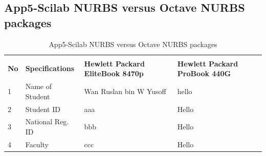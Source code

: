 \begin{landscape}
	\subsection{App5-Scilab NURBS versus Octave NURBS packages}
	
	\begin{table}[ht]
		\begin{center}
			\caption{App5-Scilab NURBS versus Octave NURBS packages}		
			\label{tabl2:App5-Scilab NURBS versus Octave NURBS packages}	
			
			\begin{tabular}{ |p{0.5cm}|p{5.0cm}|p{9.0cm}|p{9.0cm}|}
				\rowcolor{gray!10}			
				\hline \multicolumn{4}{|c|}{\textbf{Scilab NURBS versus Octave NURBS packages}} \\ [1.0ex]
				\rowcolor{gray!10}
				\hline \textbf{No} & \textbf{Specifications}    & \textbf{Hewlett Packard EliteBook 8470p} & \textbf{Hewlett Packard ProBook 440G}\\ 
				
				\hline 1 & Name of Student    & Wan Ruslan bin W Yusoff & hello\\ 
				\hline 2 & Student ID         &  aaa & Hello\\ 
				\hline 3 & National Reg. ID   & bbb  & Hello\\ 
				\hline 4 & Faculty            & ccc  & Hello\\ 
				
				\hline
			\end{tabular}
		\end{center}
	\end{table}  
	
\end{landscape}
\clearpage
